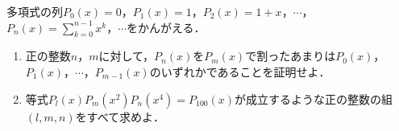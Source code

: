 \documentclass[../../main.tex]{subfiles}
\begin{document}
多項式の列$P_0(x)=0$，$P_1(x)=1$，$P_2(x)=1+x$，$\cdots$，$P_n(x)=\sum_{k=0}^{n-1}x^k$，$\cdots$をかんがえる．
\begin{enumerate}
  \item 正の整数$n$，$m$に対して，$P_n(x)$を$P_m(x)$で割ったあまりは$P_0(x)$，$P_1(x)$，$\cdots$，$P_{m-1}(x)$のいずれかであることを証明せよ．
  \item 等式$P_l(x)P_m(x^2)P_n(x^4)=P_{100}(x)$が成立するような正の整数の組$(l,m,n)$をすべて求めよ．
\end{enumerate}
\end{document}
